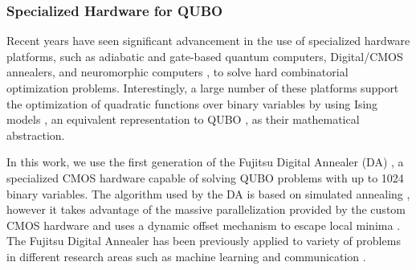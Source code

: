 \documentclass[preprint,12pt]{elsarticle}
\newcommand{\todo}[1]{{\textcolor{red}{\bf {#1}}}}
\begin{document}





\subsubsection{Specialized Hardware for QUBO}

Recent years have seen significant advancement in the use of specialized hardware platforms, such as adiabatic and gate-based quantum computers, Digital/CMOS annealers, and neuromorphic computers \cite{coffrin2019evaluating}, to solve hard combinatorial optimization problems. Interestingly, a large number of these platforms support the optimization of quadratic functions over binary variables by using Ising models \cite{johnson2011quantum}, an equivalent representation to QUBO \cite{bian2010ising}, as their mathematical abstraction.

In this work, we use the first generation of the Fujitsu Digital Annealer (DA) \cite{aramon2019physics}, a specialized CMOS hardware capable of solving QUBO problems with up to 1024 binary variables. The algorithm used by the DA is based on simulated annealing \cite{kirkpatrick1983optimization}, however it takes advantage of the massive parallelization provided by the custom CMOS hardware and uses a dynamic offset mechanism to escape local minima \cite{aramon2019physics}. The Fujitsu Digital Annealer has been previously applied to variety of problems in different research areas such as machine learning \cite{cohen2020ising,salehinejad2019ising} and communication \cite{naghsh2019digitally,rahman2019ising}.
\end{document}
